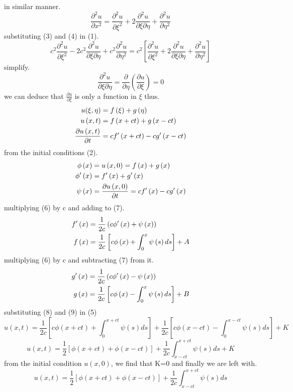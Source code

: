 \documentclass[]{article}
\begin{document}
in similar manner.
\begin{equation}
\frac{\partial^2 u}{\partial x^2} = \frac{\partial^2 u}{\partial\xi^2}+2\frac{\partial^2 u}{\partial\xi\partial\eta}+\frac{\partial^2 u}{\partial\eta^2}
\end{equation}
substituting (3) and (4) in (1).
\[
c^2\frac{\partial^2 u}{\partial\xi^2}-2c^2\frac{\partial^2 u}{\partial\xi\partial\eta}+c^2\frac{\partial^2 u}{\partial\eta^2} = c^2\left[\frac{\partial^2 u}{\partial\xi^2}+2\frac{\partial^2 u}{\partial\xi\partial\eta}+\frac{\partial^2 u}{\partial\eta^2}\right]    
\]
simplify.
\[
    \frac{\partial^2 u}{\partial\xi\partial\eta} = \frac{\partial}{\partial\eta}\left(\frac{\partial u}{\partial\xi}\right)= 0    
\]
we can deduce that $\frac{\partial u}{\partial\xi}$ is only a function in $\xi$ thus.
\begin{align}
u(\xi , \eta) &= f\left(\xi\right)+g\left(\eta \right)\notag
\\
u\left(x,t\right)&=f\left(x+ct\right)+g\left(x-ct\right)
\\
\frac{\partial u\left(x,t\right)}{\partial t} &= cf'\left(x+ct\right)-cg'\left(x-ct\right)\notag
\end{align}
from the initial conditions (2).
\begin{align}
\phi\left(x\right) &= u\left(x,0\right)= f\left(x\right)+g\left(x\right)\notag
\\ 
\phi'\left(x\right) &= f'\left(x\right)+g'\left(x\right)
\\ 
\psi\left(x\right)&=\frac{\partial u\left(x,0\right)}{\partial t} = cf'\left(x\right)-cg'\left(x\right)
\end{align}
multiplying (6) by c and adding to (7).
\begin{align}
f'\left(x\right) &= \frac{1}{2c}\left(c\phi'\left(x\right)+\psi\left(x\right)\right)\notag
\\ 
f\left(x\right) &= \frac{1}{2c}\left[c\phi\left(x\right)+\int_0^x \psi\left(s\right)ds\right]+A
\end{align}
multiplying (6) by c and subtracting (7) from it.
\begin{align}
g'\left(x\right) &= \frac{1}{2c}\left(c\phi'\left(x\right)-\psi\left(x\right)\right)\notag
\\ 
g\left(x\right) &= \frac{1}{2c}\left[c\phi\left(x\right)-\int_0^x \psi\left(s\right)ds\right]+B
\end{align}
substituting (8) and (9) in (5)
\[
    u\left(x,t\right) = \frac{1}{2c}\left[c\phi\left(x+ct\right)+\int_{0}^{x+ct} \psi\left(s\right)ds\right]+\frac{1}{2c}\left[c\phi\left(x-ct\right)-\int_{0}^{x-ct} \psi\left(s\right)ds\right]+K    
\]
\[
    u\left(x,t\right) = \frac{1}{2}\left[\phi\left(x+ct\right)+\phi\left(x-ct\right)\right]+\frac{1}{2c}\int_{x-ct}^{x+ct} \psi\left(s\right)ds + K    
\]
from the initial condition $u(x,0)$, we find that K=0 and finally we are left with.
\[
    u\left(x,t\right) = \frac{1}{2}\left[\phi\left(x+ct\right)+\phi\left(x-ct\right)\right]+\frac{1}{2c}\int_{x-ct}^{x+ct} \psi\left(s\right)ds    
\]
\end{document}
